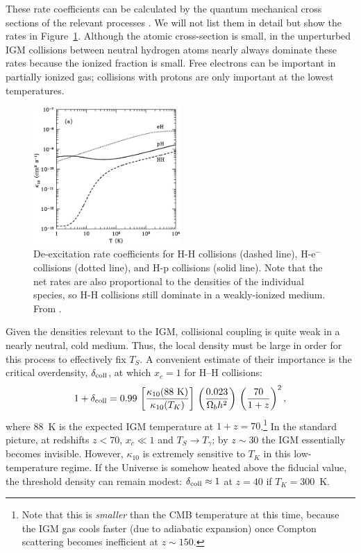 These rate coefficients can be calculated by the quantum mechanical cross sections of the relevant processes \cite{zygelman05, furl07-electron, furl07-proton}. We will not list them in detail but show the rates in Figure~\ref{fig:collrates}.  Although the atomic cross-section is small, in the unperturbed IGM collisions between neutral hydrogen atoms nearly always dominate these rates because the ionized fraction is small.  Free electrons can be important in partially ionized gas; collisions with protons are only important at the lowest temperatures.

\begin{figure}[]
\begin{center}
\includegraphics[width=0.5\textwidth]{Furlanetto/figure2-1}
\end{center}
\caption{De-excitation rate coefficients for H-H collisions (dashed
line), H-e$^-$ collisions (dotted line), and H-p collisions (solid
line).  Note that the net rates are also proportional to the densities
of the individual species, so H-H collisions still dominate in a
weakly-ionized medium. From \cite{furl07-proton}.}
\label{fig:collrates}
\end{figure}

Given the densities relevant to the IGM, collisional coupling is quite weak in a nearly neutral, cold medium.  Thus, the local density must be large in order for this process to effectively fix $T_S$. A convenient estimate of their
importance is the critical overdensity, $\delta_{\rm coll}$, at which
$x_c=1$ for H--H collisions:
\begin{equation}
1 + \delta_{\rm coll} = 0.99 \, \left[ \frac{\kappa_{10}(88 \ \mbox{K})}{\kappa_{10}(T_K)} \right] \, \left( \frac{0.023}{\Omega_b
    h^2} \right) \, \left( \frac{70}{1+z} \right)^2,
\label{eq:dcoll}
\end{equation}
where 88~K is the expected IGM temperature at $1+z=70$.\footnote{Note that this is \emph{smaller} than the CMB temperature at this time, because the IGM gas cools faster (due to adiabatic expansion) once Compton scattering becomes inefficient at $z \sim 150$.}  In the standard picture, at redshifts $z < 70$, $x_c \ll 1$ and $T_S \rightarrow T_{\gamma}$; by $z \sim 30$ the IGM essentially becomes invisible.  However, $\kappa_{10}$ is extremely sensitive to $T_K$ in this low-temperature regime.  If the Universe is somehow heated above the fiducial value, the threshold density can remain modest: $\delta_{\rm coll} \approx 1$ at $z=40$ if $T_K=300$~K.

